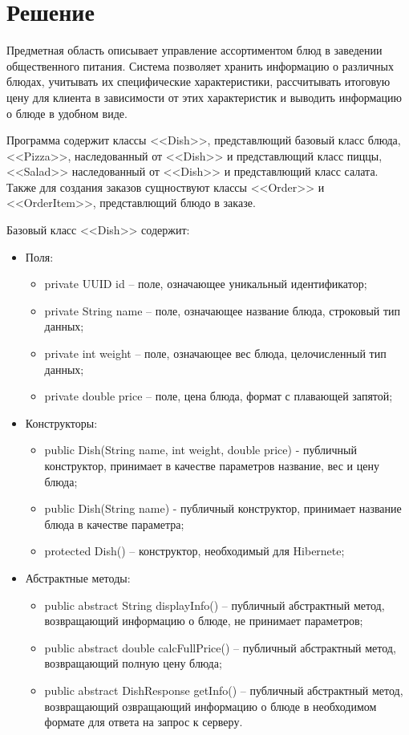 \documentclass[a4paper,14pt]{extarticle}
\begin{document}
\section*{\hspace{12.5mm}Решение}
Предметная область описывает управление ассортиментом блюд в заведении общественного питания. Система позволяет хранить информацию о различных блюдах, учитывать их специфические характеристики, рассчитывать итоговую цену для клиента в зависимости от этих характеристик и выводить информацию о блюде в удобном виде.

Программа содержит классы <<Dish>>, представлющий базовый класс блюда,  <<Pizza>>, наследованный от <<Dish>> и представлющий класс пиццы, <<Salad>> наследованный от <<Dish>> и представлющий класс салата. Также для создания заказов сущноствуют классы <<Order>> и <<OrderItem>>, представлющий блюдо в заказе.

Базовый класс <<Dish>> содержит:
\begin{itemize}
  \item[--] Поля:
    \begin{itemize}
      \item[--] private UUID id -- поле, означающее уникальный идентификатор;
      \item[--] private String name -- поле, означающее название блюда, строковый тип данных;
      \item[--] private int weight -- поле, означающее вес блюда, целочисленный тип данных;
      \item[--] private double price -- поле, цена блюда, формат с плавающей запятой;
    \end{itemize}
  \item[--] Конструкторы:
    \begin{itemize}
      \item[--] public Dish(String name, int weight, double price) - публичный конструктор, принимает  в качестве параметров название, вес и цену блюда;
      \item[--] public Dish(String name) - публичный конструктор, принимает название блюда в качестве параметра;
      \item[--] protected Dish() {} -- конструктор, необходимый для Hibernete;
    \end{itemize}
  \item[--] Абстрактные методы:
    \begin{itemize}
      \item[--] public abstract String displayInfo() -- публичный абстрактный метод, возвращающий информацию о блюде, не принимает параметров;
      \item[--] public abstract double calcFullPrice() -- публичный абстрактный метод, возвращающий полную цену блюда;
      \item[--] public abstract DishResponse getInfo() -- публичный абстрактный метод, возвращающий озвращающий информацию о блюде в необходимом формате для ответа на запрос к серверу.
    \end{itemize}
\end{itemize}
\end{document}
